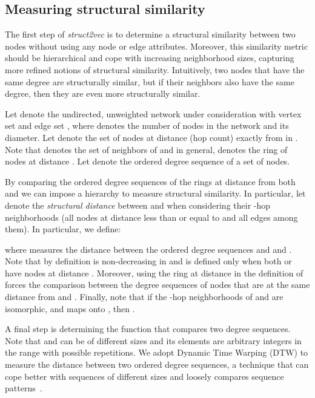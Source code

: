\documentclass[sigconf]{acmart}
\begin{document}
\subsection{Measuring structural similarity}
\label{defining_context}



The first step of \textit{struct2vec} is to determine a structural similarity between two nodes without using any node or edge attributes. Moreover, this similarity metric should be hierarchical and cope with increasing neighborhood sizes, capturing more refined notions of structural similarity. Intuitively, two nodes that have the same degree are structurally similar, but if their neighbors also have the same degree, then they are even more structurally similar. 

Let  denote the undirected, unweighted network under consideration with vertex set  and edge set , where  denotes the number of nodes in the network and  its diameter. Let  denote the set of nodes at distance (hop count) exactly  from  in . Note that  denotes the set of neighbors of  and in general,  denotes the ring of nodes at distance . Let  denote the ordered degree sequence of a set  of nodes. 



By comparing the ordered degree sequences of the rings at distance  from both  and  we can impose a hierarchy to measure structural similarity. In particular, let  denote the {\em structural distance} between  and  when considering their -hop neighborhoods (all nodes at distance less than or equal to  and all edges among them). In particular, we define: 

where  measures the distance between the ordered degree sequences  and  and . Note that by definition  is non-decreasing in  and is defined only when both  or  have nodes at distance . Moreover, using the ring at distance  in the definition of  forces the comparison between the degree sequences of nodes that are at the same distance from  and . Finally, note that if the -hop neighborhoods of  and  are isomorphic, and maps  onto , then .

A final step is determining the function that compares two degree sequences. Note that  and  can be of different sizes and its elements are arbitrary integers in the range  with possible repetitions. We adopt Dynamic Time Warping (DTW) to measure the distance between two ordered degree sequences, a technique that can cope better with sequences of different sizes and loosely compares sequence patterns~\cite{rakthanmanon2013,salvador2004fastdtw}.
\end{document}
